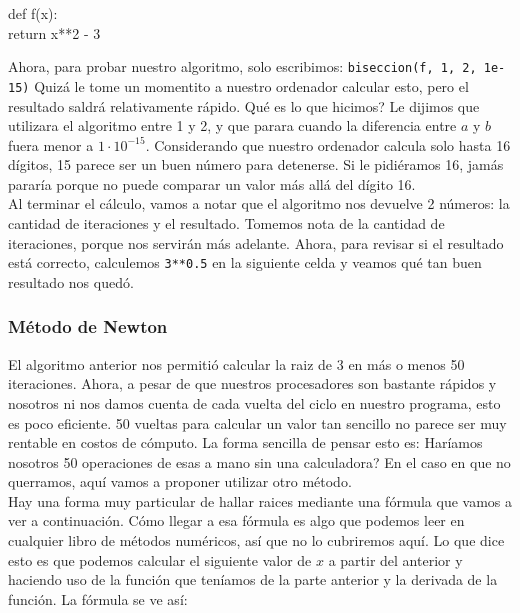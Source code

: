 \documentclass[10pt,letterpaper]{article}
\newcommand{\inlinecode}[1]{
\colorbox{light-gray}{\texttt{#1}}
}
\newenvironment{Code}
{
\begin{lrbox}{\selvestebox}%
\begin{minipage}{\dimexpr\columnwidth-2\fboxsep\relax}
\fontfamily{\ttdefault}\selectfont
}
{\end{minipage}\end{lrbox}%
\begin{center}
\colorbox{light-gray}{\usebox{\selvestebox}}
\end{center}
}
\begin{document}
\begin{footnotesize}
\begin{Code}
def f(x):\\
\hspace*{5mm} return x**2 - 3
\end{Code}
\end{footnotesize}

Ahora, para probar nuestro algoritmo, solo escribimos: \inlinecode{biseccion(f, 1, 2, 1e-15)} Quiz\'a le tome un momentito a nuestro ordenador calcular esto, pero el resultado saldr\'a relativamente r\'apido. Qu\'e es lo que hicimos? Le dijimos que utilizara el algoritmo entre 1 y 2, y que parara cuando la diferencia entre $a$ y $b$ fuera menor a $1\cdot10^{-15}$. Considerando que nuestro ordenador calcula solo hasta 16 d\'igitos, 15 parece ser un buen n\'umero para detenerse. Si le pidi\'eramos 16, jam\'as parar\'ia porque no puede comparar un valor m\'as all\'a del d\'igito 16.\\

Al terminar el c\'alculo, vamos a notar que el algoritmo nos devuelve 2 n\'umeros: la cantidad de iteraciones y el resultado. Tomemos nota de la cantidad de iteraciones, porque nos servir\'an m\'as adelante. Ahora, para revisar si el resultado est\'a correcto, calculemos \inlinecode{3**0.5} en la siguiente celda y veamos qu\'e tan buen resultado nos qued\'o.

\subsubsection{M\'etodo de Newton}
El algoritmo anterior nos permiti\'o calcular la raiz de 3 en m\'as o menos 50 iteraciones. Ahora, a pesar de que nuestros procesadores son bastante r\'apidos y nosotros ni nos damos cuenta de cada vuelta del ciclo en nuestro programa, esto es poco eficiente. 50 vueltas para calcular un valor tan sencillo no parece ser muy rentable en costos de c\'omputo. La forma sencilla de pensar esto es: Har\'iamos nosotros 50 operaciones de esas a mano sin una calculadora? En el caso en que no querramos, aqu\'i vamos a proponer utilizar otro m\'etodo.\\

Hay una forma muy particular de hallar raices mediante una f\'ormula que vamos a ver a continuaci\'on. C\'omo llegar a esa f\'ormula es algo que podemos leer en cualquier libro de m\'etodos num\'ericos, as\'i que no lo cubriremos aqu\'i. Lo que dice esto es que podemos calcular el siguiente valor de $x$ a partir del anterior y haciendo uso de la funci\'on que ten\'iamos de la parte anterior y la derivada de la funci\'on. La f\'ormula se ve as\'i:
\end{document}
